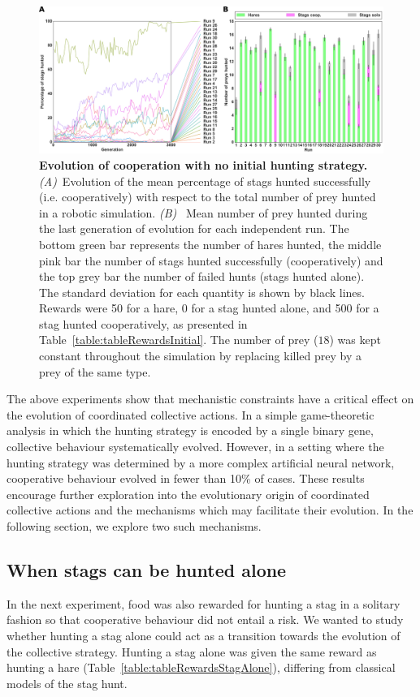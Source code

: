     \begin{figure}[h]
      \centerfloat
        \includegraphics[scale = 1.0]{fig/ArticleBio1/Fig5.png}
      \caption{\textbf{Evolution of cooperation with no initial hunting strategy.} 
      {\em (A)}~Evolution of the mean percentage of stags hunted successfully (i.e. cooperatively) with respect to the total number of prey hunted in a robotic simulation. {\em (B)}~ Mean number of prey hunted during the last generation of evolution for each independent run. The bottom green bar represents the number of hares hunted, the middle pink bar the number of stags hunted successfully (cooperatively) and the top grey bar the number of failed hunts (stags hunted alone). The standard deviation for each quantity is shown by black lines. Rewards were 50 for a hare, 0 for a stag hunted alone, and 500 for a stag hunted cooperatively, as presented in Table~\ref{table:tableRewardsInitial}. The number of prey ($18$) was kept constant throughout the simulation by replacing killed prey by a prey of the same type.}
      \label{fig:initialRandom}
    \end{figure}

    The above experiments show that mechanistic constraints have a critical effect on the evolution of coordinated collective actions. In a simple game-theoretic analysis in which the hunting strategy is encoded by a single binary gene, collective behaviour systematically evolved. However, in a setting where the hunting strategy was determined by a more complex artificial neural network, cooperative behaviour evolved in fewer than 10\% of cases. These results encourage further exploration into the evolutionary origin of coordinated collective actions and the mechanisms which may facilitate their evolution. In the following section, we explore two such mechanisms.


  \subsection{When stags can be hunted alone}
  \label{successfulCooperation}
    In the next experiment, food was also rewarded for hunting a stag in a solitary fashion so that cooperative behaviour did not entail a risk. We wanted to study whether hunting a stag alone could act as a transition towards the evolution of the collective strategy. Hunting a stag alone was given the same reward as hunting a hare (Table~\ref{table:tableRewardsStagAlone}), differing from classical models of the stag hunt.

